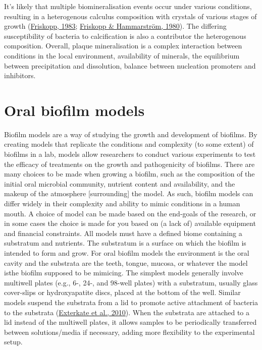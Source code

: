 \documentclass[
  letterpaper,
]{book}
\begin{document}
It's likely that multiple biomineralisation events occur under various
conditions, resulting in a heterogenous calculus composition with
crystals of various stages of growth
(\protect\hyperlink{ref-friskoppUltrastructureNondecalcified1983}{Friskopp,
1983}; \protect\hyperlink{ref-friskoppComparativeScanning1980}{Friskopp
\& Hammarström, 1980}). The differing susceptibility of bacteria to
calcification is also a contributor the heterogenous composition.
Overall, plaque mineralisation is a complex interaction between
conditions in the local environment, availability of minerals, the
equilibrium between precipitation and dissolution, balance between
nucleation promoters and inhibitors.

\hypertarget{oral-biofilm-models}{%
\section{Oral biofilm models}\label{oral-biofilm-models}}

Biofilm models are a way of studying the growth and development of
biofilms. By creating models that replicate the conditions and
complexity (to some extent) of biofilms in a lab, models allow
researchers to conduct various experiments to test the efficacy of
treatments on the growth and pathogenicity of biofilms. There are many
choices to be made when growing a biofilm, such as the composition of
the initial oral microbial community, nutrient content and availability,
and the makeup of the atmosphere {[}surrounding{]} the model. As such,
biofilm models can differ widely in their complexity and ability to
mimic conditions in a human mouth. A choice of model can be made based
on the end-goals of the research, or in some cases the choice is made
for you based on (a lack of) available equipment and financial
constraints. All models must have a defined biome containing a
substratum and nutrients. The substratum is a surface on which the
biofilm is intended to form and grow. For oral biofilm models the
environment is the oral cavity and the substrata are the teeth, tongue,
mucosa, or whatever the model isthe biofilm supposed to be mimicing. The
simplest models generally involve multiwell plates (e.g., 6-, 24-, and
98-well plates) with a substratum, usually glass cover-slips or
hydroxyapatite discs, placed at the bottom of the well. Similar models
suspend the substrata from a lid to promote active attachment of
bacteria to the substrata
(\protect\hyperlink{ref-extercateAAA2010}{Exterkate et al., 2010}). When
the substrata are attached to a lid instead of the multiwell plates, it
allows samples to be periodically transferred between solutions/media if
necessary, adding more flexibility to the experimental setup.
\end{document}
